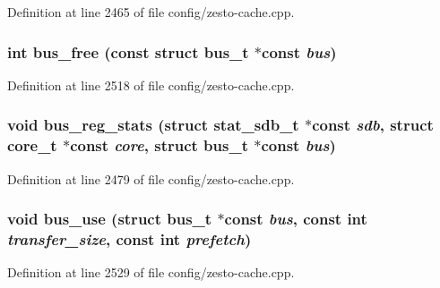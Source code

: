 Definition at line 2465 of file config/zesto-cache.cpp.
\subsubsection[{bus\_\-free}]{\setlength{\rightskip}{0pt plus 5cm}int bus\_\-free (const struct {\bf bus\_\-t} $\ast$const  {\em bus})}\label{config_2zesto-cache_8h_24292dcf41327971f03a4c7150cbdf28}




Definition at line 2518 of file config/zesto-cache.cpp.
\subsubsection[{bus\_\-reg\_\-stats}]{\setlength{\rightskip}{0pt plus 5cm}void bus\_\-reg\_\-stats (struct {\bf stat\_\-sdb\_\-t} $\ast$const  {\em sdb}, \/  struct {\bf core\_\-t} $\ast$const  {\em core}, \/  struct {\bf bus\_\-t} $\ast$const  {\em bus})}\label{config_2zesto-cache_8h_22d7e9c4a1a2031601e5a3ad3694768c}




Definition at line 2479 of file config/zesto-cache.cpp.
\subsubsection[{bus\_\-use}]{\setlength{\rightskip}{0pt plus 5cm}void bus\_\-use (struct {\bf bus\_\-t} $\ast$const  {\em bus}, \/  const int {\em transfer\_\-size}, \/  const int {\em prefetch})}\label{config_2zesto-cache_8h_cb6440bff7b9405665cbae0d836630f3}




Definition at line 2529 of file config/zesto-cache.cpp.
